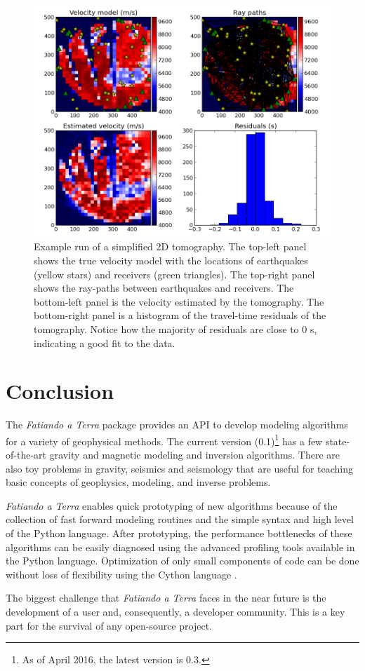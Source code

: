 \begin{figure}
    \centering
    \includegraphics[width=\textwidth]{figures/paper-fatiando/seismic_tomo}
    \caption{
        Example run of a simplified 2D tomography. The top-left panel shows the
        true velocity model with the locations of earthquakes (yellow stars)
        and receivers (green triangles). The top-right panel shows the
        ray-paths between earthquakes and receivers. The bottom-left panel is
        the velocity estimated by the tomography. The bottom-right panel is a
        histogram of the travel-time residuals of the tomography. Notice how
        the majority of residuals are close to 0 s, indicating a good fit to
        the data.
    }
    \label{fig:p1-tomo}
\end{figure}




\section{Conclusion}

The \textit{Fatiando a Terra} package provides an API to develop modeling
algorithms for a variety of geophysical methods. The current version
(0.1)\footnote{
    As of April 2016, the latest version is 0.3.}
has a few state-of-the-art gravity and magnetic modeling and
inversion algorithms. There are also toy problems in gravity, seismics
and seismology that are useful for teaching basic concepts of
geophysics, modeling, and inverse problems.

\textit{Fatiando a Terra} enables quick prototyping of new algorithms because of
the collection of fast forward modeling routines and the simple syntax
and high level of the Python language. After prototyping, the
performance bottlenecks of these algorithms can be easily diagnosed
using the advanced profiling tools available in the Python language.
Optimization of only small components of code can be done without loss
of flexibility using the Cython language \citep{behnel2011}.

The biggest challenge that \textit{Fatiando a Terra} faces in the near future is
the development of a user and, consequently, a developer community. This
is a key part for the survival of any open-source project.
